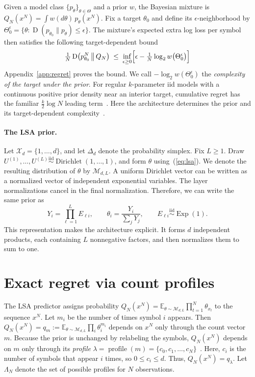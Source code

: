 \documentclass[anon]{alt2027}
\newcommand{\Xd}{\mathcal{X}_d}
\newcommand{\simplex}{\Delta_d}
\newcommand{\LSA}{\mathcal{M}_{d,L}}
\newcommand{\Exp}{\operatorname{Exp}}
\newcommand{\Dir}{\operatorname{Dirichlet}}
\newcommand{\profile}{\operatorname{profile}}
\newcommand{\E}{\mathbb{E}}
\newcommand{\KL}{\operatorname{D}}
\renewcommand{\eqref}[1]{(\ref{#1})}
\begin{document}
Given a model class $\{p_\theta\}_{\theta\in\Theta}$ and a prior $w$, the Bayesian mixture is $Q_N(x^N)=\int w(d\theta)\,p_\theta(x^N)$. Fix a target $\theta_0$ and define its $\epsilon$-neighborhood by $\Theta_0^\epsilon=\{\theta:\KL(p_{\theta_0}\|p_\theta)\le\epsilon\}$. The mixture's expected extra log loss per symbol then satisfies the following target-dependent bound~\citep{Barron1987,feder2025framework}
\begin{equation}
\label{eq:priormass}
\tfrac1N\KL\bigl(p^N_{\theta_0}\,\big\|\,Q_N\bigr)\;\le\;\inf_{\epsilon\ge0}\Bigl[\epsilon-\tfrac1N\log_2 w\bigl(\Theta_0^\epsilon\bigr)\Bigr]
\end{equation}
Appendix~\ref{app:regret} proves the bound. We call $-\log_2 w(\Theta_0^\epsilon)$ the \emph{complexity of the target under the prior}. For regular $k$-parameter iid models with a continuous positive prior density near an interior target, cumulative regret has the familiar $\frac{k}{2}\log N$ leading term~\citep{clarke1990information}. Here the architecture determines the prior and its target-dependent complexity~\citep{feder2025framework}.

\paragraph{The LSA prior.}
Let $\Xd=\{1,\dots,d\}$, and let $\simplex$ denote the probability simplex. Fix $L\ge1$. Draw $U^{(1)},\dots,U^{(L)}\stackrel{\mathrm{iid}}{\sim}\Dir(1,\dots,1)$, and form $\theta$ using~\eqref{eq:lsa}. We denote the resulting distribution of $\theta$ by $\LSA$. A uniform Dirichlet vector can be written as a normalized vector of independent exponential variables. The layer normalizations cancel in the final normalization. Therefore, we can write the same prior as
\begin{equation}
\label{eq:exprep}
Y_i=\prod_{\ell=1}^{L}E_{\ell i},\qquad \theta_i=\frac{Y_i}{\sum_{j}Y_j},\qquad E_{\ell i}\stackrel{\mathrm{iid}}{\sim}\Exp(1).
\end{equation}
This representation makes the architecture explicit. It forms $d$ independent products, each containing $L$ nonnegative factors, and then normalizes them to sum to one. 

\section{Exact regret via count profiles}
\label{sec:regret}

The LSA predictor assigns probability $Q_N(x^N)=\E_{\theta\sim\LSA}\prod_{t=1}^N\theta_{x_t}$ to the sequence $x^N$. Let $m_i$ be the number of times symbol $i$ appears. Then $Q_N(x^N)=q_m:=\E_{\theta\sim\LSA}\prod_i\theta_i^{m_i}$ depends on $x^N$ only through the count vector $m$. Because the prior is unchanged by relabeling the symbols, $Q_N(x^N)$ depends on $m$ only through its \emph{profile} $\lambda=\profile(m)=\{c_0,c_1,\ldots,c_N\}$~\citep{orlitsky2004modeling}. Here, $c_i$ is the number of symbols that appear $i$ times, so $0\leq c_i\leq d$. Thus, $Q_N(x^N)=q_\lambda$. Let $\Lambda_N$ denote the set of possible profiles for $N$ observations.
\end{document}
